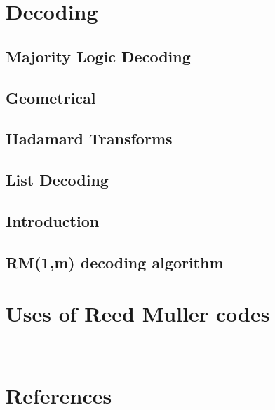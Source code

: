 \documentclass[]{article}
\begin{document}
\section {Decoding}
\subsection {Majority Logic Decoding}
\subsection {Geometrical}
\subsection {Hadamard Transforms}

\subsection {List Decoding}
\subsection {Introduction}
\subsection {RM(1,m) decoding algorithm}

\section {Uses of Reed Muller codes}

~\cite{codingtheory+blog}
\section {References}

      

\end{document}

